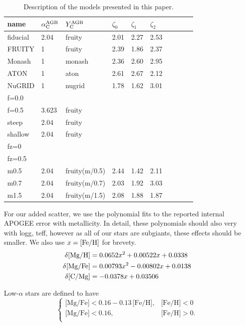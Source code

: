 \documentclass[fleqn,
usenatbib]{mnras}
\begin{document}
\begin{table}
	\centering
    \caption[]{Description of the models presented in this paper.}
	\label{tab:model_parameters}

	\begin{tabular}{l l l l l l l l l l}
		\hline
            name & $\alpha_{\rm C}^{\rm AGB}$ & $Y_{\rm C}^{\rm AGB}$ & $\zeta_0$ & $\zeta_1$ & $\zeta_2$ \\ 
            \hline
            fiducial & 2.04 & fruity & 2.01 & 2.27 & 2.53 \\
            FRUITY & 1 & fruity & 2.39 & 1.86 & 2.37 \\
            Monash & 1 & monash & 2.36 & 2.60 & 2.95 \\
            ATON & 1 & aton & 2.61 & 2.67 & 2.12 \\
            NuGRID & 1 & nugrid & 1.78 & 1.62 & 3.01 \\
            f=0.0 &  \\
            f=0.5 & 3.623 & fruity  \\
            steep & 2.04 & fruity \\
            shallow & 2.04 & fruity \\
            fz=0 \\
            fz=0.5 \\
            m0.5 & 2.04 & fruity(m/0.5)  & 2.44 & 1.42 & 2.11 \\
            m0.7 & 2.04 & fruity(m/0.7) & 2.03 & 1.92 & 3.03 \\
            m1.5 & 2.04 & fruity(m/1.5) & 2.08 & 1.88 & 1.87 \\
		\hline
	\end{tabular}
\end{table}



For our added scatter, we use the polynomial fits to the reported internal APOGEE error with metallicity. In detail, these polynomials should also very with logg, teff, however as all of our stars are subgiants, these effects should be smaller. We also use $x={\rm [Fe/H]}$ for brevety.
\begin{subequations}
\begin{align}
    \delta {\rm [Mg/H]} &= 0.0652 x^2 + 0.00522 x + 0.0338 \\
    \delta {\rm [Mg/Fe]} &= 0.00793 x^2 - 0.00802 x + 0.0138 \\
    \delta {\rm [C/Mg]} &= -0.0378x + 0.03506 
\end{align}
\end{subequations}

Low-$\alpha$ stars are defined to have 
\begin{equation}\label{eq:high_alpha}
\begin{cases}
\text{[Mg/Fe]} <0.16-0.13\,\text{[Fe/H]}, & \text{[Fe/H]}<0\\
\text{[Mg/Fe]} <0.16, & \text{[Fe/H]}>0. \\
\end{cases}
\end{equation}




\bsp	%
\label{lastpage}
\end{document}
